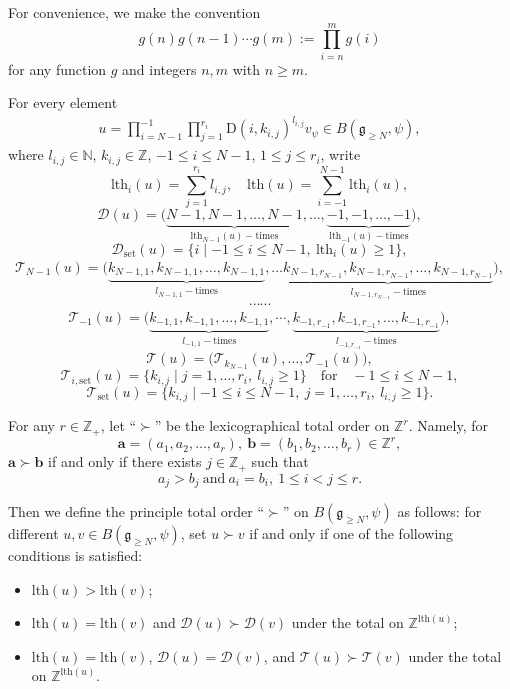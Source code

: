 \documentclass[12pt, a4paper]{amsart}
\newcommand{\fg}{\mathfrak g}
\newcommand{\N}{\mathbb N}
\newcommand{\Z}{\mathbb Z}
\newcommand{\rD}{\mathrm{D}}
\theoremstyle{Theorem}
\theoremstyle{Theorem}
\numberwithin{equation}{section}
\begin{document}
For convenience, we make the convention
\[g(n)g(n-1)\cdots g(m):=\prod_{i=n}^{m}g(i)\]
for any function $g$ and integers $n,m$ with $n\geq m$.

For every element \begin{align}\label{typical-vector}u=
\prod_{i=N-1}^{-1}\prod_{j=1}^{r_{i}}\rD(i,k_{i,j})^{l_{i,j}}v_{\psi}\in B(\fg_{\geq N},\psi),\end{align}
where $l_{i,j}\in\N$, $k_{i,j}\in\Z$, $-1\leq i\leq N-1$, $1\leq j\leq r_{i}$, write
\[\text{lth}_{i}(u)=\sum_{j=1}^{r_{i}}l_{i,j},\quad \text{lth}(u)=\sum_{i=-1}^{N-1}\text{lth}_{i}(u),\]
\[\mathcal{D}(u)=\big(\underbrace{N-1,N-1,\dots,N-1}_{\mathrm{lth}_{N-1}(u)-\mathrm{times}},
\dots,\underbrace{-1,-1,\dots,-1}_{\mathrm{lth}_{-1}(u)-\mathrm{times}}\big),\]
\[\mathcal{D}_{\mathrm{set}}(u)=\{i\mid -1\leq i\leq N-1,\ \text{lth}_{i}(u)\geq1\},\]
$$\begin{aligned}\mathcal{T}_{N-1}(u)=\big(\underbrace{k_{N-1,1},k_{N-1,1},\dots,k_{N-1,1}}_{l_{N-1,1}-\mathrm{times}},\dots
\underbrace{k_{N-1,r_{N-1}},k_{N-1,r_{N-1}},\dots,k_{N-1,r_{N-1}}}_{l_{N-1,r_{N-1}}-\mathrm{times}}\big),\end{aligned}$$
\[\cdots\cdots\]
$$\begin{aligned}\mathcal{T}_{-1}(u)=\big(\underbrace{k_{-1,1},k_{-1,1},\dots,k_{-1,1}}_{l_{-1,1}-\mathrm{times}},\cdots,
\underbrace{k_{-1,r_{-1}},k_{-1,r_{-1}},\dots,k_{-1,r_{-1}}}_{l_{-1,r_{-1}}-\mathrm{times}}\big),\end{aligned}$$
\[\mathcal{T}(u)=\big(\mathcal{T}_{k_{N-1}}(u),\dots,\mathcal{T}_{-1}(u)\big),\]
\[\mathcal{T}_{i,\mathrm{set}}(u)=\{k_{i,j}\mid j=1,\dots,r_{i},\ l_{i,j}\geq1\}\quad \text{for}\quad -1\leq i\leq N-1,\]
\[\mathcal{T}_{\mathrm{set}}(u)=\{k_{i,j}\mid -1\leq i\leq N-1,\ j=1,\dots,r_{i},\ l_{i,j}\geq1\}.\]


For any $r\in\Z_+$, let ``$\succ$'' be the lexicographical total order on $\Z^{r}$.
Namely,
for \[\bm{a}=(a_1,a_2,\dots,a_{r}),\ \bm{b}=(b_1,b_2,\dots,b_{r})\in\Z^{r},\]
$\bm{a}\succ\bm{b}$ if and only if there exists $j\in\Z_+$ such that
\begin{equation}\label{total-order}a_j>b_j\ \text{and}\ a_{i}=b_{i},\ 1\leq i<j\leq r.\end{equation}

Then we define the principle total order ``$\succ$'' on $B(\fg_{\geq N},\psi)$ as follows:
for different $u,v\in B(\fg_{\geq N},\psi)$, set $u\succ v$ if and only if one of the following conditions is satisfied:
     \begin{itemize}
     \item $\text{lth}(u)>\text{lth}(v)$;
     \item $\text{lth}(u)=\text{lth}(v)$ and $\mathcal{D}(u)\succ\mathcal{D}(v)$ under the total on $\Z^{\text{lth}(u)}$;
     \item $\text{lth}(u)=\text{lth}(v)$, $\mathcal{D}(u)=\mathcal{D}(v)$,
     and $\mathcal{T}(u)\succ \mathcal{T}(v)$ under the total on $\Z^{\text{lth}(u)}$.
     \end{itemize}
\end{document}
